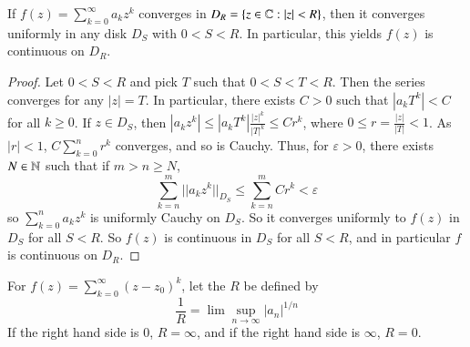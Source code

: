 \begin{prop}\label{prop:3.3.2}
    If $f(z) = \sum_{k=0}^{\infty}a_kz^k$ converges in $D_R = \{z \in \mathbb C:|z| < R\}$, then it converges uniformly in any disk $D_S$ with $0 < S < R$. In particular, this yields $f(z)$ is continuous on $D_R$.
\end{prop}
\begin{proof}
    Let $0 < S < R$ and pick $T$ such that $0 < S < T<R$. Then the series converges for any $|z| = T$. In particular, there exists $C > 0$ such that $|a_kT^k| < C$ for all $k \geq 0$. If $z \in D_S$, then $|a_kz^k| \leq |a_kT^k|\frac{|z|^k}{|T|^k} \leq Cr^k$, where $0 \leq r = \frac{|z|}{|T|} < 1$. As $|r| < 1$, $C\sum_{k=0}^nr^k$ converges, and so is Cauchy. Thus, for $\varepsilon > 0$, there exists $N \in \mathbb N$ such that if $m > n \geq N$, \begin{equation*}
        \sum_{k=n}^m||a_kz^k||_{D_S} \leq \sum_{k=n}^mCr^k < \varepsilon
    \end{equation*}
    so $\sum_{k=0}^na_kz^k$ is uniformly Cauchy on $D_S$. So it converges uniformly to $f(z)$ in $D_S$ for all $S < R$. So $f(z)$ is continuous in $D_S$ for all $S < R$, and in particular $f$ is continuous on $D_R$.
\end{proof}

\begin{defn}
    For $f(z) = \sum_{k=0}^{\infty}(z-z_0)^k$, let the  $R$ be defined by \begin{equation*}
        \frac{1}{R} = \lim\sup_{n\rightarrow \infty}|a_n|^{1/n}
    \end{equation*}
    If the right hand side is $0$, $R = \infty$, and if the right hand side is $\infty$, $R = 0$.
\end{defn}

